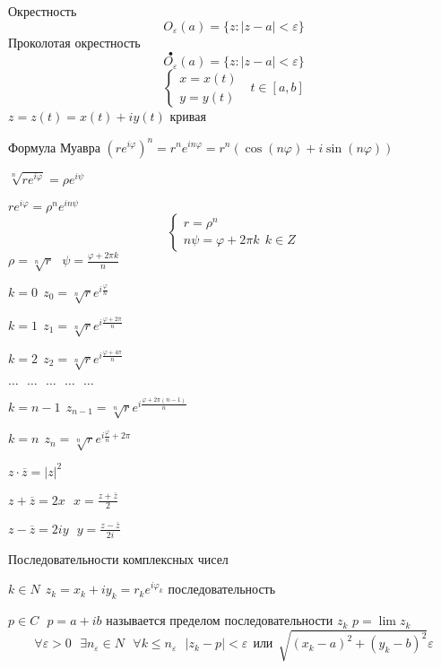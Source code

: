 \begin{block}
  Окрестность
  $$
  O_{\varepsilon}(a) = \{ z: |z-a| < \varepsilon\}
  $$
  Проколотая окрестность
  $$
  \stackrel{\bullet}{O_{\varepsilon}}(a) = \{ z: |z-a| < \varepsilon\}
  $$
  $$
  \left\{
  \begin{array}{l}
    x = x(t) \\
    y = y(t)
  \end{array}
  \right. ~~~ t \in [a,b]
  $$
  $z = z(t) = x(t) + iy(t)$ кривая

  Формула Муавра
  $(r e^{i\varphi})^n = r^n e^{in\varphi} = r^n(\cos(n\varphi) +
  i\sin(n\varphi))$

  $\sqrt[n]{re^{i\varphi}} = \rho e^{i\psi}$

  $re^{i\varphi} = \rho^n e^{in\psi}$
  $$
  \left\{
  \begin{array}{l}
    r = \rho^n \\
    n\psi = \varphi + 2\pi k ~~ k \in Z
  \end{array}
  \right.
  $$
  $\rho = \sqrt[n]{r} ~~~ \psi = \frac{\varphi + 2\pi k}{n}$

  $k = 0 ~~ z_0 = \sqrt[n]{r} e^{i\frac{\varphi}{n}}$

  $k = 1 ~~ z_1 = \sqrt[n]{r} e^{i\frac{\varphi + 2\pi}{n}}$

  $k = 2 ~~ z_2 = \sqrt[n]{r} e^{i\frac{\varphi + 4\pi}{n}}$

  $\ldots ~~~ \ldots ~~~ \ldots ~~~ \ldots ~~~ \ldots$

  $k = n-1 ~~ z_{n-1} = \sqrt[n]{r} e^{i\frac{\varphi + 2\pi(n-1)}{n}}$

  $k = n ~~ z_n = \sqrt[n]{r} e^{i\frac{\varphi}{n} + 2\pi}$

  $z \cdot \overline{z} = |z|^2$

  $z + \overline{z} = 2x ~~~ x = \frac{z + \overline{z}}{2}$

  $z - \overline{z} = 2iy ~~~ y = \frac{z - \overline{z}}{2i}$
\end{block}

\begin{title}[\Large]
  Последовательности комплексных чисел
\end{title}

\begin{define}
  $k \in N ~~ z_k = x_k + iy_k = r_k e^{i \varphi_k}$ последовательность

  $p \in C ~~~ p = a + ib$ называется пределом последовательности $z_k$
  $p = \lim z_k$
  $$
  \forall \varepsilon > 0 ~~~ \exists n_{\varepsilon} \in N ~~~
  \forall k \le n_{\varepsilon} ~~~ |z_k - p| < \varepsilon ~~ \text{или} ~~
  \sqrt{(x_k - a)^2 + (y_k - b)^2} \varepsilon
  $$
\end{define}

